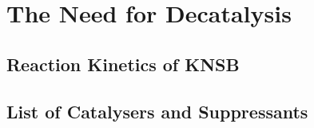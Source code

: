 \section{The Need for Decatalysis}
	\subsection{Reaction Kinetics of KNSB}
		\lipsum[1-3]
	\subsection{List of Catalysers and Suppressants}
		\lipsum[1]

